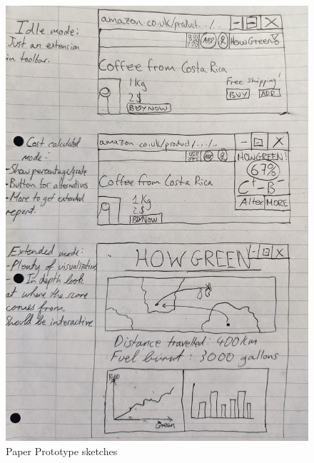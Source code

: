 \documentclass[a4,10pt,twocolumn]{article}
\begin{document}
\begin{figure}[h]
    \centering
    \includegraphics[width=0.9\columnwidth]{assets/prototype/paper_prototype.jpg}
    \caption{Paper Prototype sketches}
\end{figure}
\end{document}
